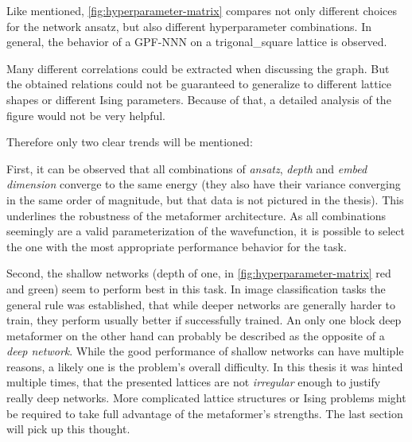 Like mentioned, \autoref{fig:hyperparameter-matrix} compares not only different choices for the network ansatz, but also different hyperparameter combinations.
In general, the behavior of a GPF-NNN on a trigonal\_square lattice is observed.

Many different correlations could be extracted when discussing the graph.
But the obtained relations could not be guaranteed to generalize to different lattice shapes or different Ising parameters.
Because of that, a detailed analysis of the figure would not be very helpful.

Therefore only two clear trends will be mentioned:

First, it can be observed that all combinations of \emph{ansatz}, \emph{depth} and \emph{embed dimension} converge to the same energy (they also have their variance converging in the same order of magnitude, but that data is not pictured in the thesis).
This underlines the robustness of the metaformer architecture.
As all combinations seemingly are a valid parameterization of the wavefunction, it is possible to select the one with the most appropriate performance behavior for the task.

Second, the shallow networks (depth of one, in \autoref{fig:hyperparameter-matrix} red and green) seem to perform best in this task.
In image classification tasks the general rule was established, that while deeper networks are generally harder to train, they perform usually better if successfully trained.
An only one block deep metaformer on the other hand can probably be described as the opposite of a \emph{deep network}.
While the good performance of shallow networks can have multiple reasons, a likely one is the problem's overall difficulty.
In this thesis it was hinted multiple times, that the presented lattices are not \emph{irregular} enough to justify really deep networks.
More \glqq complicated\grqq{} lattice structures or Ising problems might be required to take full advantage of the metaformer's strengths. 
The last section will pick up this thought.
